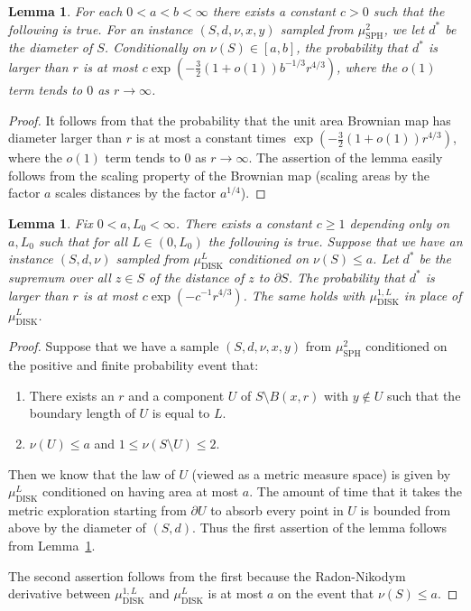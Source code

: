 \documentclass[10pt]{amsart}
\theoremstyle{plain}
\numberwithin{theorem}{section}
\newtheorem{lemma}[theorem]{Lemma}
\theoremstyle{definition}
\newcommand{\mustwo}{\mu_{\mathrm{SPH}}^2}
\newcommand{\mudonel}{\mu_{ \mathrm{DISK}}^{1, L}}
\newcommand{\mudl}{\mu_{\mathrm{DISK}}^L}
\begin{document}
\begin{lemma}
\label{lem::brownian_map_diameter_bound}
For each $0 < a < b < \infty$ there exists a constant $c > 0$ such that the following is true. For an instance $(S,d,\nu,x,y)$ sampled from $\mustwo$, we let $d^*$ be the diameter of $S$. Conditionally on $\nu(S) \in [a,b]$, the probability that $d^*$ is larger than $r$ is at most $c \exp(-\tfrac{3}{2}(1+o(1)) b^{-1/3} r^{4/3})$, where the $o(1)$ term tends to $0$ as $r \to \infty$.
\end{lemma}
\begin{proof}
It follows from \cite[Prop.\,14]{serlet_ldp} that the probability that the unit area Brownian map has diameter larger than $r$ is at most a constant times \hbox{$\exp(-\tfrac{3}{2}(1+o(1)) r^{4/3})$}, where the $o(1)$ term tends to $0$ as $r \to \infty$. The assertion of the lemma easily follows from the scaling property of the Brownian map (scaling areas by the factor $a$ scales distances by the factor $a^{1/4}$).
\end{proof}

\begin{lemma}
\label{lem::brownian_disk_area_bound}
Fix $0 < a, L_0 < \infty$. There exists a constant $c \geq 1$ depending only on $a, L_0$ such that for all $L \in (0,L_0)$ the following is true. Suppose that we have an instance $(S,d,\nu)$ sampled from $\mudl$ conditioned on $\nu(S) \leq a$. Let $d^*$ be the supremum over all $z \in S$ of the distance of $z$ to $\partial S$. The probability that $d^*$ is larger than $r$ is at most $c \exp(-c^{-1} r^{4/3})$. The same holds with $\mudonel$ in place of $\mudl$.
\end{lemma}
\begin{proof}
Suppose that we have a sample $(S,d,\nu,x,y)$ from $\mustwo$ conditioned on the positive and finite probability event that:
\begin{enumerate}
\item There exists an $r$ and a component $U$ of $S \setminus B(x,r)$ with $y \notin U$ such that the boundary length of $U$ is equal to $L$.
\item $\nu(U) \leq a$ and $1 \leq \nu(S \setminus U) \leq 2$.
\end{enumerate}
Then we know that the law of $U$ (viewed as a metric measure space) is given by $\mudl$ conditioned on having area at most $a$. The amount of time that it takes the metric exploration starting from $\partial U$ to absorb every point in $U$ is bounded from above by the diameter of $(S,d)$. Thus the first assertion of the lemma follows from Lemma~\ref{lem::brownian_map_diameter_bound}.

The second assertion follows from the first because the Radon-Nikodym derivative between $\mudonel$ and $\mudl$ is at most $a$ on the event that $\nu(S) \leq a$.
\end{proof}
\end{document}
